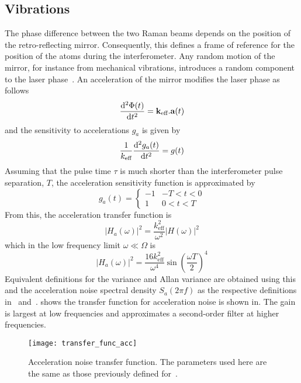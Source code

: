 \subsection{Vibrations}\label{subsec:vibration_noise}
The phase difference between the two Raman beams depends on the
position of the retro-reflecting mirror. Consequently, this defines a frame of
reference for the position of the atoms during the interferometer. Any
random motion of the mirror, for instance from mechanical vibrations,
introduces a random component to the laser phase~\cite{Vigue2006}. An acceleration of
the mirror modifies the laser phase as follows
\begin{equation}
  \frac{\mathrm{d}^2 \Phi(t)}{\mathrm{d} t^2} = {\textbf k_\textnormal{eff}}.\textbf{a}(t)
  \label{eq:phase_acc}
\end{equation}
and the sensitivity to accelerations \(g_a\) is given by
\begin{equation}
  \frac{1}{k_\text{eff}} \frac{\mathrm{d}^2 g_a(t)}{\mathrm{d} t^2} =
  g(t) \\
  \label{eq:acc_sens}
\end{equation}
Assuming that the pulse time \(\tau\) is much shorter than the
interferometer pulse separation, \(T\), the acceleration sensitivity
function is approximated by
\begin{equation}
  g_a(t) = \begin{cases}
 -1 & - T < t < 0\\
 1 & 0 < t < T
  \end{cases}
  \label{eq:acc_sens_approx}
\end{equation}
From this, the acceleration transfer function is
\begin{equation}
  |H_a(\omega)|^2 = \frac{k_\text{eff}^2}{\omega^2}|H(\omega)|^2 
  \label{eq:acc_transfer}
\end{equation}
which in the low frequency limit \(\omega \ll \Omega\) is
\begin{equation}
  |H_a(\omega)|^2 = \frac{16 k_\text{eff}^2}{\omega^4}
  \sin\left(\frac{\omega T}{2}\right)^4
  \label{eq:acc_tf_low}
\end{equation}
Equivalent definitions for the variance and Allan variance are
obtained using this and the acceleration noise spectral density
\(S_a(2\pi f)\) as the respective definitions
in~
and~. 
shows the transfer function for
acceleration noise is shown in. The
gain is largest at low frequencies and approximates a second-order
filter at higher frequencies.
\begin{figure}[htpb]
  \centering
  \texttt{[image: transfer\_func\_acc]}
  \caption[Acceleration noise transfer function.]{Acceleration noise
  transfer function. The parameters used here are the same as those
previously defined for~.}
  \label{fig:transfer_func_acc}
\end{figure}

